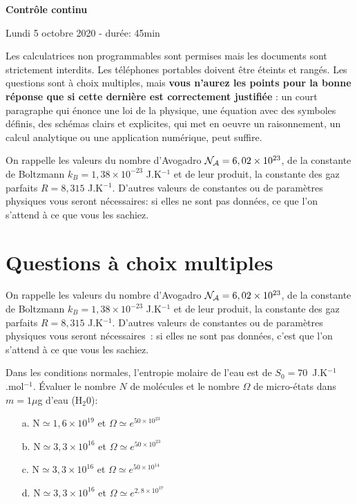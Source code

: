 \documentclass[utf8, 11pt]{feuille}
\begin{document}
\begin{center}
    \Large {\bf Contrôle continu}
    
    Lundi 5 octobre 2020 - durée: 45min
\end{center}

Les calculatrices non programmables sont permises mais les documents sont strictement interdits.
Les téléphones portables doivent être éteints et rangés. Les questions sont à choix multiples, mais  \textbf{vous n'aurez les points pour la bonne réponse  que si cette dernière est correctement justifiée} : un court paragraphe qui énonce une loi de la physique, une équation avec des symboles définis, des schémas clairs et explicites, qui met en oeuvre un raisonnement, un calcul analytique ou une application numérique, peut suffire.

\medskip

On rappelle les valeurs du nombre d'Avogadro ${\cal N_A}=6,02 \times 10^{23}$, de la constante de Boltzmann $k_B=1,38 \times 10^{-23}$ J.K$^{-1}$ et de leur produit, la constante des gaz parfaits $R=8,315$ J.K$^{-1}$. D'autres valeurs de constantes ou de paramètres physiques vous seront nécessaires: si elles ne sont pas données, ce que l'on s'attend à ce que vous les sachiez.


\section{Questions à choix multiples}

On rappelle les valeurs du nombre d'Avogadro ${\cal N_A}=6,02 \times 10^{23}$, de la constante de Boltzmann $k_B=1,38 \times 10^{-23}$ J.K$^{-1}$ et de leur produit, la constante des gaz parfaits $R=8,315$ J.K$^{-1}$. D'autres valeurs de constantes ou de paramètres physiques vous seront nécessaires~: si elles ne sont pas données, c'est que l'on s'attend à ce que vous les sachiez.

\question
Dans les conditions normales, l'entropie molaire de l'eau est de $S_0 = 70$~J.K$^{-1}$.mol$^{-1}$. Évaluer le nombre $N$ de molécules et le nombre $\Omega$ de micro-états dans $ m=1 \mu$g d'eau (H$_2$0):
\begin{itemize}
\item[a. ] N$\simeq 1,6 \times 10^{19}$ et  $\Omega \simeq e^{50\times 10^{23}}$
\item[b. ] N$\simeq 3,3 \times 10^{16}$ et  $\Omega \simeq e^{50\times 10^{23}}$
\item[c. ] N$\simeq 3,3 \times 10^{16}$ et  $\Omega \simeq e^{50 \times 10^{14}}$
\item[d. ] N$\simeq 3,3 \times 10^{16}$ et  $\Omega \simeq e^{2,8\times 10^{17}}$
\end{itemize}
\end{document}
